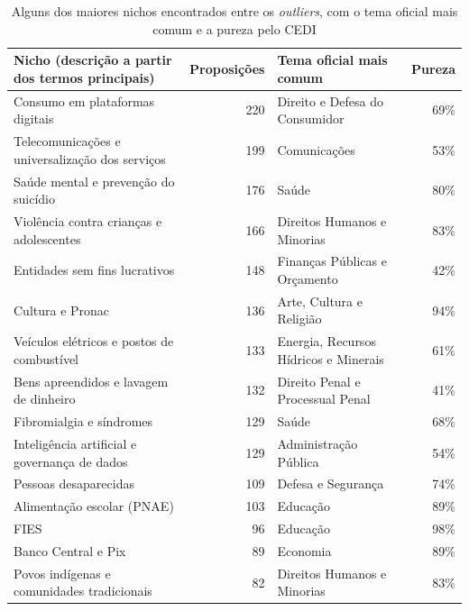 \begin{table}[H]
\centering
\caption{Alguns dos maiores nichos encontrados entre os \textit{outliers}, com o tema oficial mais comum e a pureza pelo CEDI}
\label{tab:nichos}
\small
\begin{tabularx}{\textwidth}{>{\raggedright\arraybackslash}X r >{\raggedright\arraybackslash}p{4.4cm} r}
\toprule
\textbf{Nicho (descrição a partir dos termos principais)} & \textbf{Proposições} & \textbf{Tema oficial mais comum} & \textbf{Pureza} \\
\midrule
Consumo em plataformas digitais & 220 & Direito e Defesa do Consumidor & 69\% \\
Telecomunicações e universalização dos serviços & 199 & Comunicações & 53\% \\
Saúde mental e prevenção do suicídio & 176 & Saúde & 80\% \\
Violência contra crianças e adolescentes & 166 & Direitos Humanos e Minorias & 83\% \\
Entidades sem fins lucrativos & 148 & Finanças Públicas e Orçamento & 42\% \\
Cultura e Pronac & 136 & Arte, Cultura e Religião & 94\% \\
Veículos elétricos e postos de combustível & 133 & Energia, Recursos Hídricos e Minerais & 61\% \\
Bens apreendidos e lavagem de dinheiro & 132 & Direito Penal e Processual Penal & 41\% \\
Fibromialgia e síndromes & 129 & Saúde & 68\% \\
Inteligência artificial e governança de dados & 129 & Administração Pública & 54\% \\
Pessoas desaparecidas & 109 & Defesa e Segurança & 74\% \\
Alimentação escolar (PNAE) & 103 & Educação & 89\% \\
FIES & 96 & Educação & 98\% \\
Banco Central e Pix & 89 & Economia & 89\% \\
Povos indígenas e comunidades tradicionais & 82 & Direitos Humanos e Minorias & 83\% \\
\bottomrule
\end{tabularx}
\end{table}

